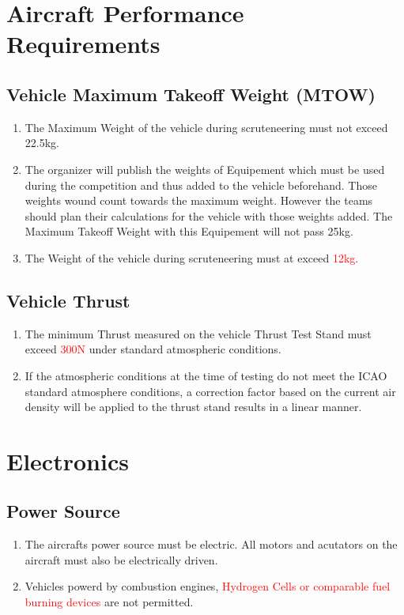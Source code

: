 \documentclass{article}
\begin{document}
\section{Aircraft Performance Requirements}

\subsection{Vehicle Maximum Takeoff Weight (MTOW)}
\begin{enumerate}
  \item The Maximum Weight of the vehicle during scruteneering must not exceed 22.5kg.
  \item The organizer will publish the weights of Equipement which must be used during the competition and thus added to the vehicle beforehand. Those weights wound count towards the maximum weight. 
  However the teams should plan their calculations for the vehicle with those weights added. The Maximum Takeoff Weight with this Equipement will not pass 25kg.  
  \item The Weight of the vehicle during scruteneering must at exceed \textcolor{red}{12kg}.  
\end{enumerate}

\subsection{Vehicle Thrust}
\begin{enumerate}
  \item The minimum Thrust measured on the vehicle Thrust Test Stand must exceed \textcolor{red}{300N} under standard atmospheric conditions.
  \item If the atmospheric conditions at the time of testing do not meet the ICAO standard atmosphere conditions, a correction factor based on the current air density will be applied to the thrust stand results in a linear manner.
\end{enumerate}


\section{Electronics}


\subsection{Power Source}
\begin{enumerate}
  \item The aircrafts power source must be electric. All motors and acutators on the aircraft must also be electrically driven.
  \item Vehicles powerd by combustion engines, \textcolor{red}{Hydrogen Cells or comparable fuel burning devices} are not permitted. 
\end{enumerate}
\end{document}

